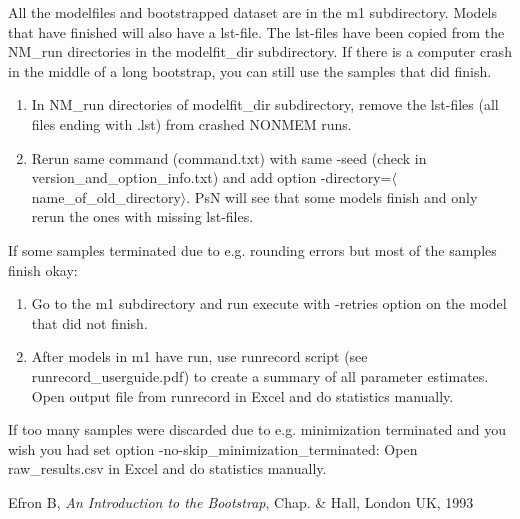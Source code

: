 All the modelfiles and bootstrapped dataset are in the m1 subdirectory. Models that have finished will also have a lst-file. The lst-files have been copied from the NM\_run directories in the modelfit\_dir  subdirectory.  
If there is a computer crash in the middle of a long bootstrap, you can still use the samples that did finish. 
\begin{enumerate}
	\item In NM\_run directories of modelfit\_dir subdirectory, remove the lst-files (all files ending with .lst) from crashed NONMEM runs.
	\item Rerun same command (command.txt) with same -seed (check in version\_and\_option\_info.txt) and add option -directory=$\langle$name\_of\_old\_directory$\rangle$. PsN will see that some models finish and only rerun the ones with missing lst-files. 
\end{enumerate}
If some samples terminated due to e.g. rounding errors but most of the samples finish okay: 
\begin{enumerate}
	\item Go to the m1 subdirectory and run execute with -retries option on the model that did not finish. 
	\item After models in m1 have run, use runrecord script (see runrecord\_userguide.pdf) to create a summary of all parameter estimates. Open output file from runrecord in Excel and do statistics manually. 
\end{enumerate}
If too many samples were discarded due to e.g. minimization terminated and you wish you had set  option -no-skip\_minimization\_terminated: Open raw\_results.csv in Excel and do statistics manually. 


\begin{thebibliography}{1}
 Efron B, {\em An Introduction to the Bootstrap}, Chap. \& Hall, London UK, 1993
\end{thebibliography}


